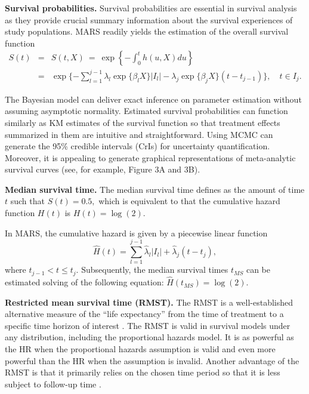 \documentclass[12pt]{article}
\theoremstyle{mystyle}
\begin{document}
\vspace{6pt}
\noindent\textbf{Survival probabilities.} \hspace{\parindent}
Survival probabilities are essential in survival analysis as they provide crucial summary information about the survival experiences of study populations. MARS readily yields the estimation of the overall survival function %
\begin{eqnarray}
\label{eq:4}
S(t) &=& S(t,X) \ = \ \exp \left\{ -\int_{0}^{t}h(u,X)du\right\} \nonumber\\
&=&\exp \{-\sum_{l=1}^{j-1}\lambda_l\exp\{\beta_l X\}|I_l| -\lambda_j\exp\{\beta_j X\}(t-t_{j-1}) \}, \quad t\in I_j.
\end{eqnarray} 

The Bayesian model can deliver exact inference on parameter estimation without assuming asymptotic normality.  Estimated survival probabilities can function similarly as KM estimates of the survival function so that treatment effects summarized in them are intuitive and straightforward. Using MCMC can generate the 95\% credible intervals (CrIs) for uncertainty quantification. Moreover, it is appealing to generate graphical representations of meta-analytic survival curves (see, for example, Figure 3A and 3B).

\vspace{6pt}
\noindent\textbf{Median survival time.} \hspace{\parindent}
The median survival time defines as the amount of time $t$ such that $S(t)=0.5,$ which is equivalent to that the cumulative hazard function $H(t)$ is $H(t)=\log(2).$

In MARS, the cumulative hazard is given by a piecewise linear function
\begin{equation*}
\hat{H}(t) = \sum_{l=1}^{j-1} \hat{\lambda}_l|I_l|+\hat{\lambda}_j(t-t_j),
\end{equation*}
where $t_{j-1}<t\leq t_j$. Subsequently, the median survival times $t_{MS}$ can be estimated solving of the following equation: $\hat{H}(t_{MS}) = \log(2).$

\vspace{6pt}
\noindent\textbf{Restricted mean survival time (RMST).} \hspace{\parindent}
The RMST is a well-established alternative measure of the “life expectancy” from the time of treatment to a specific time horizon of interest \citep{royston2013restricted}. The RMST is valid in survival models under any distribution, including the proportional hazards model. It is as powerful as the HR when the proportional hazards assumption is valid and even more powerful than the HR when the assumption is invalid. Another advantage of the RMST is that it primarily relies on the chosen time period so that it is less subject to follow-up time \citep{kim2017restricted}.
\end{document}
